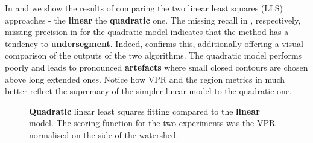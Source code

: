 In  and  we show the results of comparing the two linear least squares (LLS) approaches - the {\bf linear} \vs the {\bf quadratic} one. The missing recall in , respectively, missing precision in  for the quadratic model indicates that the method has a tendency to {\bf undersegment}. 
Indeed,  confirms this, additionally offering a visual comparison of the outputs of the two algorithms. The quadratic model performs poorly and leads to pronounced {\bf artefacts} where small closed contours are chosen above long extended ones. Notice how VPR  and the region metrics in  much better reflect the supremacy of the simpler linear model to the quadratic one. %

\begin{figure}[ht!]
\centering
\caption[{\bf Quadratic} linear least squares fitting compared to the {\bf linear} model - plots]{{\bf Quadratic} linear least squares fitting compared to the {\bf linear} model. The scoring function for the two experiments was the VPR normalised on the side of the watershed.}
\label{fig:quadratic-lls-fitting}
\end{figure}

